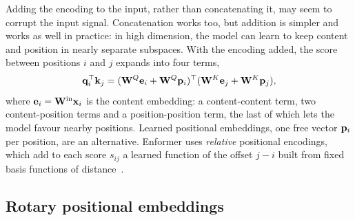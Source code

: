 Adding the encoding to the input, rather than concatenating it, may seem to corrupt the input signal. Concatenation works too, but addition is simpler and works as well in practice: in high dimension, the model can learn to keep content and position in nearly separate subspaces. With the encoding added, the score between positions $i$ and $j$ expands into four terms,
\begin{equation}
  \mathbf{q}_i^\top\mathbf{k}_j = (\mathbf{W}^Q\mathbf{e}_i + \mathbf{W}^Q\mathbf{p}_i)^\top(\mathbf{W}^K\mathbf{e}_j + \mathbf{W}^K\mathbf{p}_j),
\end{equation}
where $\mathbf{e}_i=\mathbf{W}^{\text{in}}\mathbf{x}_i$ is the content embedding: a content-content term, two content-position terms and a position-position term, the last of which lets the model favour nearby positions. Learned positional embeddings, one free vector $\mathbf{p}_i$ per position, are an alternative. Enformer uses \emph{relative} positional encodings, which add to each score $s_{ij}$ a learned function of the offset $j-i$ built from fixed basis functions of distance~\citep{avsec2021}.

\subsection{Rotary positional embeddings}

